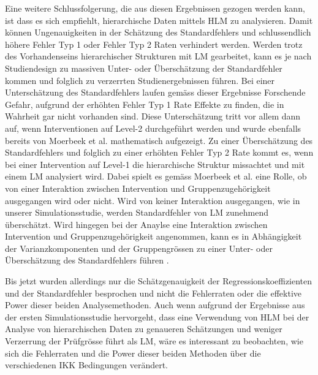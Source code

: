 \documentclass[12pt, a4paper]{article}\usepackage[]{graphicx}\usepackage[]{color}
\begin{document}
Eine weitere Schlussfolgerung, die aus diesen Ergebnissen gezogen werden kann, ist dass es sich empfiehlt, hierarchische Daten mittels HLM zu analysieren. Damit können Ungenauigkeiten in der Schätzung des Standardfehlers und schlussendlich höhere Fehler Typ 1 oder Fehler Typ 2 Raten verhindert werden. Werden trotz des Vorhandenseins hierarchischer Strukturen mit LM gearbeitet, kann es je nach Studiendesign zu massiven Unter- oder Überschätzung der Standardfehler kommen und folglich zu verzerrten Studienergebnissen führen. Bei einer Unterschätzung des Standardfehlers laufen gemäss dieser Ergebnisse Forschende Gefahr, aufgrund der erhöhten Fehler Typ 1 Rate Effekte zu finden, die in Wahrheit gar nicht vorhanden sind. Diese Unterschätzung tritt vor allem dann auf, wenn Interventionen auf Level-2 durchgeführt werden und wurde ebenfalls bereits von Moerbeek et al. \citeyearpar{MOERBEEK2003341} mathematisch aufgezeigt. Zu einer Überschätzung des Standardfehlers und folglich zu einer erhöhten Fehler Typ 2 Rate kommt es, wenn bei einer Intervention auf Level-1 die hierarchische Struktur missachtet und mit einem LM analysiert wird. Dabei spielt es gemäss Moerbeek et al. \citeyearpar{MOERBEEK2003341} eine Rolle, ob von einer Interaktion zwischen Intervention und Gruppenzugehörigkeit ausgegangen wird oder nicht. Wird von keiner Interaktion ausgegangen, wie in unserer Simulationsstudie, werden Standardfehler von LM zunehmend überschätzt. Wird hingegen bei der Anaylse eine Interaktion zwischen Intervention und Gruppenzugehörigkeit angenommen, kann es in Abhängigkeit der Varianzkomponenten und der Gruppengrössen zu einer Unter- oder Überschätzung des Standardfehlers führen \citep{MOERBEEK2003341}. 

Bis jetzt wurden allerdings nur die Schätzgenauigkeit der Regressionskoeffizienten und der Standardfehler besprochen und nicht die Fehlerraten oder die effektive Power dieser beiden Analysemethoden. Auch wenn aufgrund der Ergebnisse aus der ersten Simulationsstudie hervorgeht, dass eine Verwendung von HLM bei der Analyse von hierarchischen Daten zu genaueren Schätzungen und weniger Verzerrung der Prüfgrösse führt als LM, wäre es interessant zu beobachten, wie sich die Fehlerraten und die Power dieser beiden Methoden über die verschiedenen IKK Bedingungen verändert. 
\end{document}
